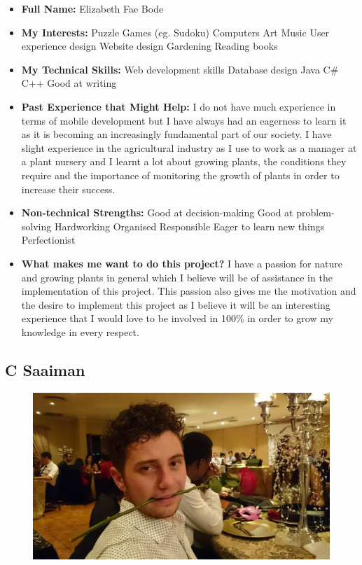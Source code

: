 \documentclass{article}
\begin{document}
	\begin{itemize}
		\item \textbf{Full Name:} Elizabeth Fae Bode
		\item \textbf{My Interests:}
		\subitem Puzzle Games (eg. Sudoku)
		\subitem Computers
		\subitem Art
		\subitem Music
		\subitem User experience design
		\subitem Website design
		\subitem Gardening
		\subitem Reading books
		
		\item \textbf{My Technical Skills:}
		\subitem Web development skills
		\subitem Database design
		\subitem Java
		\subitem C\#
		\subitem C++
		\subitem Good at writing
		
		\item \textbf{Past Experience that Might Help:} \newline
		I do not have much experience in terms of mobile development but I have always had an eagerness to learn it as it is becoming an increasingly fundamental part of our society. I have slight experience in the agricultural industry as I use to work as a manager at a plant nursery and I learnt a lot about growing plants, the conditions they require and the importance of monitoring the growth of plants in order to increase their success.
		
		\item \textbf{Non-technical Strengths:}
		\subitem Good at decision-making
		\subitem Good at problem-solving
		\subitem Hardworking
		\subitem Organised
		\subitem Responsible
		\subitem Eager to learn new things
		\subitem Perfectionist
		
		\item \textbf{What makes me want to do this project?} \newline
		I have a passion for nature and growing plants in general which I believe will be of assistance in the implementation of this project. This passion also gives me the motivation and the desire to implement this project as I believe it will be an interesting experience that I would love to be involved in 100\% in order to grow my knowledge in every respect.
	\end{itemize}

		\subsection{C Saaiman}
	\begin{figure}[h]
		\centering
		\includegraphics[height=0.3\textheight]{Saaiman.jpg}
	\end{figure}
    
\end{document}
